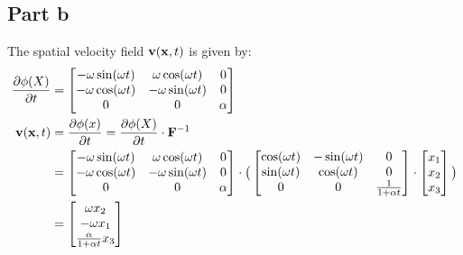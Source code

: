 \documentclass[a4paper,12pt]{article} %
\begin{document}
\subsection{Part b}
The spatial velocity field $\mathbf{v}(\mathbf{x},t)$ is given by:
\begin{align*}
\frac {\partial \phi(X)}{\partial t} &= 
    \begin{bmatrix} -\omega \sin(\omega t) & \omega\cos(\omega t) & 0 \\
                   -\omega \cos(\omega t) & -\omega\sin(\omega t) & 0 \\
                    0            & 0            & \alpha \end{bmatrix}\\
\mathbf{v}(\mathbf{x},t) &= \frac {\partial \phi(x)}{\partial t} = \frac {\partial \phi(X)}{\partial t} \cdot {\mathbf{F}}^{-1}\\
&= \begin{bmatrix} -\omega \sin(\omega t) & \omega\cos(\omega t) & 0 \\
    -\omega \cos(\omega t) & -\omega\sin(\omega t) & 0 \\
     0            & 0            & \alpha \end{bmatrix} \cdot \big (\begin{bmatrix} \cos(\omega t) & -\sin(\omega t) & 0 \\
        \sin(\omega t) & \cos(\omega t) & 0 \\
         0            & 0            & \frac{1}{1+\alpha t} \end{bmatrix} \cdot\begin{bmatrix}x_1\\x_2\\x_3\end{bmatrix}\big )\\
&= \begin{bmatrix} \omega x_2 \\ -\omega x_1 \\ \frac{\alpha}{1+\alpha t}x_3 \end{bmatrix}\\
\end{align*}
\end{document}
